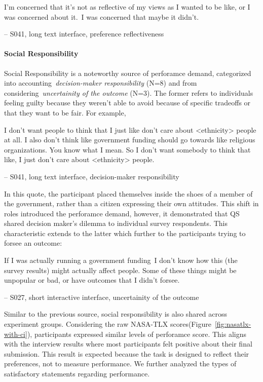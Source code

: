 \begin{displayquote}
I'm concerned that it's not as reflective of my views as I wanted to be like, or I was concerned about it.~\bracketellipsis I was concerned that maybe it didn't.

\noindent \hfill -- S041, long text interface, preference reflectiveness
\end{displayquote}

\paragraph{Social Responsibility}
Social Responsibility is a noteworthy source of perforamce demand, categorized into accounting~\textit{decision-maker responsibility} (N=8) and from considering~\textit{uncertainity of the outcome} (N=3). The former refers to individuals feeling guilty because they weren't able to avoid because of specific tradeoffs or that they want to be fair. For example, 

\begin{displayquote}
I don't want people to think that I just like don't care about <ethnicity> people at all. I also don't think like government funding should go towards like religious organizations. You know what I mean. So I don't want somebody to think that like, I just don't care about <ethnicity> people.
    
\noindent \hfill -- S041, long text interface, decision-maker responsibility
\end{displayquote}

In this quote, the participant placed themselves inside the shoes of a member of the government, rather than a citizen expressing their own attitudes. This shift in roles introduced the perforamce demand, however, it demonstrated that QS shared decision maker's dilemma to individual survey respondents. This characteristic extends to the latter which further to the participants trying to forsee an outcome:

\begin{displayquote}
If I was actually running a government funding~\bracketellipsis I don't know how this (the survey results) might actually affect people. Some of these things might be unpopular or bad, or have outcomes that I didn't forsee.
    
\noindent \hfill -- S027, short interactive interface, uncertainity of the outcome
\end{displayquote}

Similar to the previous source, social responsibility is also shared across experiment groups. Considering the raw NASA-TLX scores(Figure~\ref{fig:nasatlx-with-ci}), participants expressed similar levels of perforamce score. This aligns with the interview results where most participants felt positive about their final submission. This result is expected because the task is designed to reflect their preferences, not to measure performance. We further analyzed the types of satisfactory statements regarding performance.


